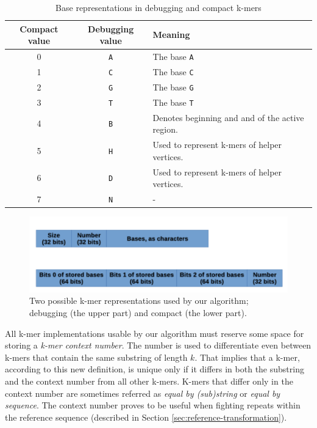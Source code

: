 \begin{table}[h]
\begin{center}
\caption{Base representations in debugging and compact k-mers}
\label{tab:base-translation}
\begin{tabular}{| c | c | p{5cm} |}
\hline
Compact value & Debugging value & Meaning \\
\hline
0 & \texttt{A} & The base \texttt{A} \\
\hline
1 & \texttt{C} & The base \texttt{C} \\
\hline
2 & \texttt{G} & The base \texttt{G} \\
\hline
3 & \texttt{T} & The base \texttt{T} \\
\hline
4 & \texttt{B} & Denotes beginning and and of the active region. \\
\hline
5 & \texttt{H} & Used to represent k-mers of helper vertices. \\
\hline
6 & \texttt{D} & Used to represent k-mers of helper vertices. \\
\hline
7 & \texttt{N} & - \\
\hline
\end{tabular}
\end{center}
\end{table}

\begin{figure}[h]
	\centering
	\includegraphics{img/kmer-representations}
	\caption{Two possible k-mer representations used by our algorithm; debugging (the upper part) and compact (the lower part).}
	\label{fig:kmer-representations}
\end{figure}

All k-mer implementations usable by our algorithm must reserve some space for storing a \textit{k-mer context number}. The number is used to differentiate even between k-mers that contain the same substring of length $k$. That implies that a k-mer, according to this new definition, is unique only if it differs in both the substring and the context number from all other k-mers. K-mers that differ only in the context number are sometimes referred as \textit{equal by (sub)string} or \textit{equal by sequence}. The context number proves to be useful when fighting repeats within the reference sequence (described in Section \ref{sec:reference-transformation}).

